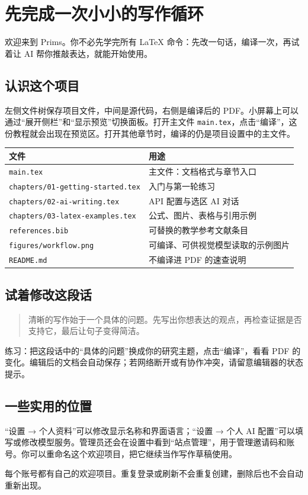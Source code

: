 \section{先完成一次小小的写作循环}
欢迎来到 Prims。你不必先学完所有 LaTeX 命令：先改一句话，编译一次，再试着让 AI 帮你推敲表达，就能开始使用。

\subsection{认识这个项目}
左侧文件树保存项目文件，中间是源代码，右侧是编译后的 PDF。小屏幕上可以通过“展开侧栏”和“显示预览”切换面板。打开主文件 \texttt{main.tex}，点击“编译”，这份教程就会出现在预览区。打开其他章节时，编译的仍是项目设置中的主文件。

\begin{center}
\begin{tabular}{ll}
\toprule
文件 & 用途 \\
\midrule
\texttt{main.tex} & 主文件：文档格式与章节入口 \\
\texttt{chapters/01-getting-started.tex} & 入门与第一轮练习 \\
\texttt{chapters/02-ai-writing.tex} & API 配置与选区 AI 对话 \\
\texttt{chapters/03-latex-examples.tex} & 公式、图片、表格与引用示例 \\
\texttt{references.bib} & 可替换的教学参考文献条目 \\
\texttt{figures/workflow.png} & 可编译、可供视觉模型读取的示例图片 \\
\texttt{README.md} & 不编译进 PDF 的速查说明 \\
\bottomrule
\end{tabular}
\end{center}

\subsection{试着修改这段话}
\begin{quote}
清晰的写作始于一个具体的问题。先写出你想表达的观点，再检查证据是否支持它，最后让句子变得简洁。
\end{quote}
\noindent 练习：把这段话中的“具体的问题”换成你的研究主题，点击“编译”，看看 PDF 的变化。编辑后的文档会自动保存；若网络断开或有协作冲突，请留意编辑器的状态提示。

\subsection{一些实用的位置}
“设置 → 个人资料”可以修改显示名称和界面语言；“设置 → 个人 AI 配置”可以填写或修改模型服务。管理员还会在设置中看到“站点管理”，用于管理邀请码和账号。你可以重命名这个欢迎项目，把它继续当作写作草稿使用。

\noindent 每个账号都有自己的欢迎项目。重复登录或刷新不会重复创建，删除后也不会自动重新出现。
